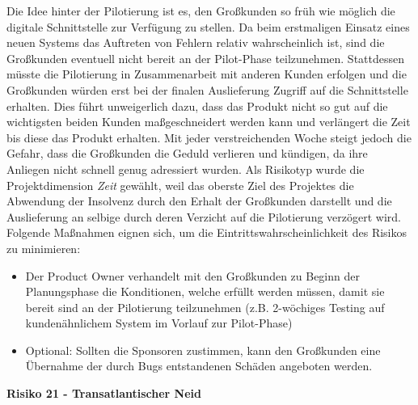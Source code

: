 Die Idee hinter der Pilotierung ist es, den Großkunden so früh wie möglich die digitale Schnittstelle zur Verfügung zu stellen. Da beim erstmaligen Einsatz eines neuen Systems das Auftreten von Fehlern relativ wahrscheinlich ist, sind die Großkunden eventuell nicht bereit an der Pilot-Phase teilzunehmen. Stattdessen müsste die Pilotierung in Zusammenarbeit mit anderen Kunden erfolgen und die Großkunden würden erst bei der finalen Auslieferung Zugriff auf die Schnittstelle erhalten. Dies führt unweigerlich dazu, dass das Produkt nicht so gut auf die wichtigsten beiden Kunden maßgeschneidert werden kann und verlängert die Zeit bis diese das Produkt erhalten. Mit jeder verstreichenden Woche steigt jedoch die Gefahr, dass die Großkunden die Geduld verlieren und kündigen, da ihre Anliegen nicht schnell genug adressiert wurden. Als Risikotyp wurde die Projektdimension \textit{Zeit} gewählt, weil das oberste Ziel des Projektes die Abwendung der Insolvenz durch den Erhalt der Großkunden darstellt und die Auslieferung an selbige durch deren Verzicht auf die Pilotierung verzögert wird. Folgende Maßnahmen eignen sich, um die Eintrittswahrscheinlichkeit des Risikos zu minimieren:
\begin{itemize}
	\item Der Product Owner verhandelt mit den Großkunden zu Beginn der Planungsphase die Konditionen, welche erfüllt werden müssen, damit sie bereit sind an der Pilotierung teilzunehmen (z.B. 2-wöchiges Testing auf kundenähnlichem System im Vorlauf zur Pilot-Phase)
	\item Optional: Sollten die Sponsoren zustimmen, kann den Großkunden eine Übernahme der durch Bugs entstandenen Schäden angeboten werden.
\end{itemize}


\vspace*{0.3cm}
\textbf{Risiko 21 - Transatlantischer Neid}
\vspace*{0.1cm}

